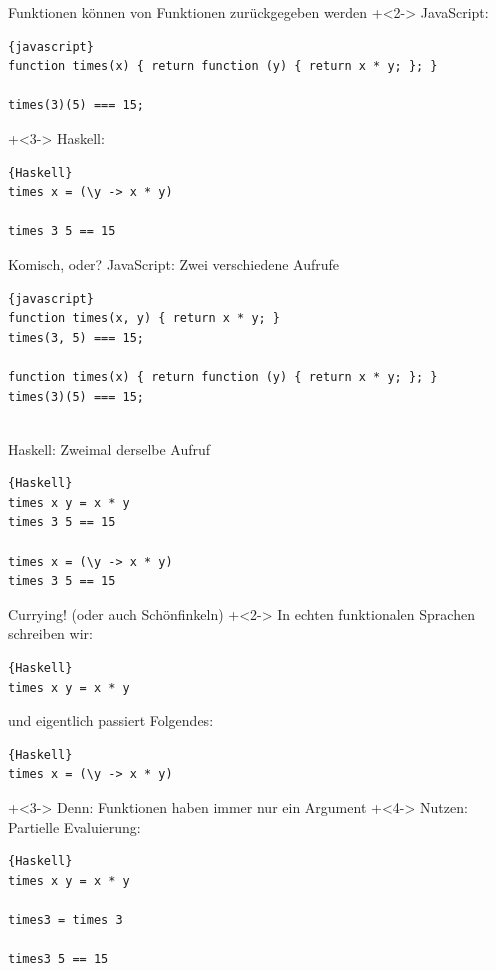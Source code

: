 \begin{frame}[fragile]{Funktionen können von Funktionen zurückgegeben werden}
\onslide+<2->
JavaScript:
\begin{lstlisting}{javascript}
function times(x) { return function (y) { return x * y; }; }

times(3)(5) === 15;
\end{lstlisting}

\onslide+<3->
Haskell:
\begin{lstlisting}{Haskell}
times x = (\y -> x * y)

times 3 5 == 15
\end{lstlisting}

\end{frame}

\begin{frame}[fragile]{Komisch, oder?}
JavaScript: Zwei verschiedene Aufrufe
\begin{lstlisting}{javascript}
function times(x, y) { return x * y; }
times(3, 5) === 15;

function times(x) { return function (y) { return x * y; }; }
times(3)(5) === 15;
\end{lstlisting}
~\\
Haskell: Zweimal derselbe Aufruf
\begin{lstlisting}{Haskell}
times x y = x * y
times 3 5 == 15

times x = (\y -> x * y)
times 3 5 == 15
\end{lstlisting}

\end{frame}

\begin{frame}[fragile]{Currying! (oder auch Schönfinkeln)}
\onslide+<2->
In echten funktionalen Sprachen schreiben wir:
\begin{lstlisting}{Haskell}
times x y = x * y
\end{lstlisting}

und eigentlich passiert Folgendes:
\begin{lstlisting}{Haskell}
times x = (\y -> x * y)
\end{lstlisting}

\onslide+<3->
Denn: Funktionen haben immer nur ein Argument
\vfill
\onslide+<4->
Nutzen: Partielle Evaluierung:
\begin{lstlisting}{Haskell}
times x y = x * y

times3 = times 3

times3 5 == 15
\end{lstlisting}


\end{frame}


